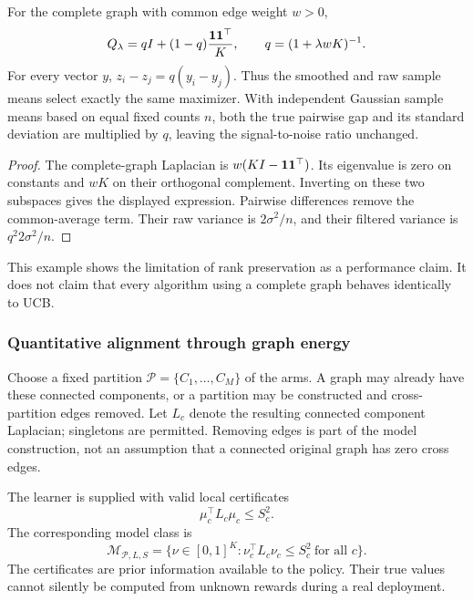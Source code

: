 \begin{proposition}
For the complete graph with common edge weight $w>0$,
\begin{equation}
 Q_\lambda=qI+(1-q)\frac{\mathbf1\mathbf1^\top}{K},\qquad
 q=(1+\lambda wK)^{-1}.
\end{equation}
For every vector $y$, $z_i-z_j=q(y_i-y_j)$. Thus the smoothed and raw sample means select exactly the same maximizer. With independent Gaussian sample means based on equal fixed counts $n$, both the true pairwise gap and its standard deviation are multiplied by $q$, leaving the signal-to-noise ratio unchanged.
\label{alignment_paper:prop:ordinal}
\end{proposition}
\begin{proof}
The complete-graph Laplacian is $w(KI-\mathbf1\mathbf1^\top)$. Its eigenvalue is zero on constants and $wK$ on their orthogonal complement. Inverting on these two subspaces gives the displayed expression. Pairwise differences remove the common-average term. Their raw variance is $2\sigma^2/n$, and their filtered variance is $q^2 2\sigma^2/n$.
\end{proof}
This example shows the limitation of rank preservation as a performance claim. It does not claim that every algorithm using a complete graph behaves identically to UCB.

\subsubsection{Quantitative alignment through graph energy}
Choose a fixed partition $\mathcal P=\{C_1,\ldots,C_M\}$ of the arms. A graph may already have these connected components, or a partition may be constructed and cross-partition edges removed. Let $L_c$ denote the resulting connected component Laplacian; singletons are permitted. Removing edges is part of the model construction, not an assumption that a connected original graph has zero cross edges.

The learner is supplied with valid local certificates
\begin{equation}
 \mu_c^\top L_c\mu_c\le S_c^2.
 \label{alignment_paper:eq:energy}
\end{equation}
The corresponding model class is
\begin{equation}
 \mathcal M_{\mathcal P,L,S}=\{\nu\in[0,1]^K:
       \nu_c^\top L_c\nu_c\le S_c^2\ \text{for all }c\}.
 \label{alignment_paper:eq:class}
\end{equation}
The certificates are prior information available to the policy. Their true values cannot silently be computed from unknown rewards during a real deployment.

